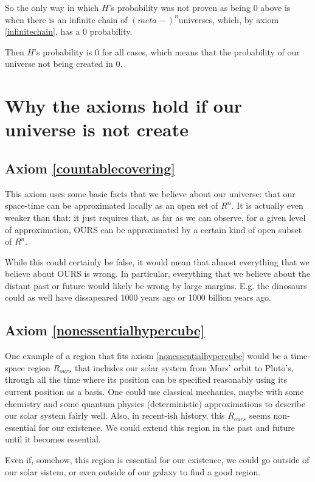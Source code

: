 \documentclass[a4paper
,draft
]{article}
\begin{document}
So the only way in which $H$'s probability was not proven as being $0$ above is when there is an infinite chain of $(meta-)^{n}$universes, which, by axiom \ref{infinitechain}, has a $0$ probability.

Then $H$'s probability is $0$ for all cases, which means that the probability of our universe not being created in $0$.

\section{Why the axioms hold if our universe is not create}

\subsection{Axiom \ref{countablecovering}}

This axiom uses some basic facts that we believe about our universe: that our space-time can be approximated locally as an open set of $R^n$. It is actually even weaker than that: it just requires that, as far as we can observe, for a given level of approximation, OURS can be approximated by a certain kind of open subset of $R^n$.

While this could certainly be false, it would mean that almost everything that we believe about OURS is wrong. In particular, everything that we believe about the distant past or future would likely be wrong by large margins. E.g. the dinosaurs could as well have dissapeared 1000 years ago or 1000 billion years ago.

\subsection{Axiom \ref{nonessentialhypercube}}

One example of a region that fits axiom \ref{nonessentialhypercube} would be a time-space region $R_{ours}$ that includes our solar system from Mars' orbit to Pluto's, through all the time where its position can be specified reasonably using its current position as a basis. One could use classical mechanics, maybe with some chemistry and some quantum physics (deterministic) approximations to describe our solar system fairly well. Also, in recent-ish history, this $R_{ours}$ seems non-essential for our existence. We could extend this region in the past and future until it becomes essential.

Even if, somehow, this region is essential for our existence, we could go outside of our solar sistem, or even outside of our galaxy to find a good region.
\end{document}
